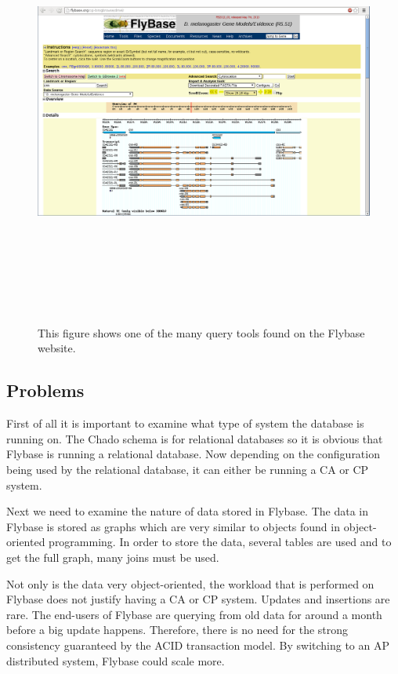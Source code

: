 \documentclass[12pt]{ucthesis}
\newcommand{\captionfonts}{\small\bf\ssp}
\begin{document}
\begin{figure}[H]
\begin{center}
\includegraphics[height=135mm,angle=90]{flybase-screenshot.png}
\captionfonts
\caption[Flybase screenshot]{This figure shows one of the many query tools found on the Flybase website.}
\label{fig:flybase-ss}
\end{center}
\end{figure}

\subsection{Problems}
First of all it is important to examine what type of system the database is running on. The Chado schema
is for relational databases so it is obvious that Flybase is running a relational database. Now depending 
on the configuration being used by the relational database, it can either be running a CA or CP system.

Next we need to examine the nature of data stored in Flybase. The data in Flybase is stored as graphs which
are very similar to objects found in object-oriented programming. In order to store the data, several tables
are used and to get the full graph, many joins must be used.

Not only is the data very object-oriented, the workload that is performed on Flybase does not justify having a CA or CP system. Updates and insertions are rare. The end-users of Flybase are querying from old data for around a month before a big update happens. Therefore, there is no need for the strong consistency guaranteed by the ACID transaction model. By switching to an AP distributed system, Flybase could scale more.
\end{document}
